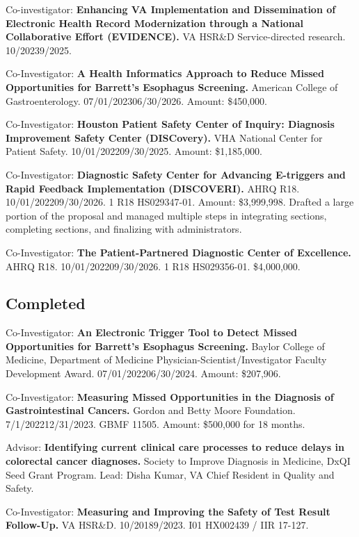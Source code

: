 \documentclass[10pt]{article}
\begin{document}
Co-investigator: \textbf{Enhancing VA Implementation and Dissemination
  of Electronic Health Record Modernization through a National
  Collaborative Effort (EVIDENCE).} VA HSR\&D Service-directed
research. 10/2023\ndash{}9/2025.

Co-Investigator: \textbf{A Health Informatics Approach to Reduce
  Missed Opportunities for Barrett's Esophagus Screening.} American
College of Gastroenterology. 07/01/2023\ndash{}06/30/2026. Amount:
\$450,000.

Co-Investigator: \textbf{Houston Patient Safety Center of Inquiry:
  Diagnosis Improvement Safety Center (DISCovery).} VHA National
Center for Patient Safety. 10/01/2022\ndash{}09/30/2025. Amount:
\$1,185,000.

Co-Investigator: \textbf{Diagnostic Safety Center for Advancing
  E-triggers and Rapid Feedback Implementation (DISCOVERI).} AHRQ R18.
10/01/2022\ndash{}09/30/2026. 1 R18 HS029347-01. Amount: \$3,999,998.
Drafted a large portion of the proposal and managed multiple steps in
integrating sections, completing sections, and finalizing with
administrators.

Co-Investigator: \textbf{The Patient-Partnered Diagnostic Center of
  Excellence.} AHRQ R18. 10/01/2022\ndash{}09/30/2026. 1 R18
HS029356-01. \$4,000,000.

\subsection*{Completed}

Co-Investigator: \textbf{An Electronic Trigger Tool to Detect Missed
  Opportunities for Barrett’s Esophagus Screening.} Baylor College of
Medicine, Department of Medicine Physician-Scientist/Investigator
Faculty Development Award. 07/01/2022\ndash{}06/30/2024. Amount:
\$207,906.

Co-Investigator: \textbf{Measuring Missed Opportunities in the
  Diagnosis of Gastrointestinal Cancers.} Gordon and Betty Moore
Foundation. 7/1/2022\ndash{}12/31/2023. GBMF 11505. Amount: \$500,000
for 18 months.

Advisor: \textbf{Identifying current clinical care processes to
  reduce delays in colorectal cancer diagnoses.} Society to Improve
Diagnosis in Medicine, DxQI Seed Grant Program. Lead: Disha Kumar, VA
Chief Resident in Quality and Safety.

Co-Investigator: \textbf{Measuring and Improving the Safety of Test
  Result Follow-Up.} VA HSR\&D. 10/2018\ndash{}9/2023. I01 HX002439 /
IIR 17-127.
\end{document}
